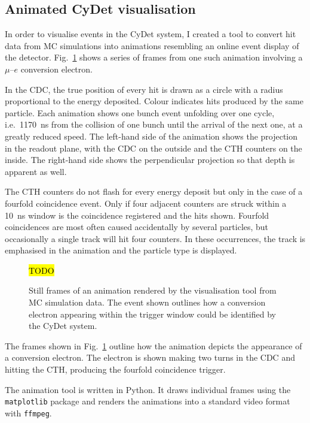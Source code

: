 \subsection{Animated CyDet visualisation}
In order to visualise events in the CyDet system, I created a tool to convert hit data from MC simulations into animations resembling an online event display of the detector. Fig.~\ref{fig:animation} shows a series of frames from one such animation involving a $\mu$--$e$ conversion electron.

In the CDC, the true position of every hit is drawn as a circle with a radius proportional to the energy deposited. Colour indicates hits produced by the same particle. Each animation shows one bunch event unfolding over one cycle, i.e.\ \SI{1170}{\ns} from the collision of one bunch until the arrival of the next one, at a greatly reduced speed.
The left-hand side of the animation shows the projection in the readout plane, with the CDC on the outside and the CTH counters on the inside. The right-hand side shows the perpendicular projection so that depth is apparent as well.

The CTH counters do not flash for every energy deposit but only in the case of a fourfold coincidence event. Only if four adjacent counters are struck within a \SI{10}{\ns} window is the coincidence registered and the hits shown. Fourfold coincidences are most often caused accidentally by several particles, but occasionally a single track will hit four counters. In these occurrences, the track is emphasised in the animation and the particle type is displayed.

\begin{figure}
    \centering
    \hl{TODO}
    \caption{Still frames of an animation rendered by the visualisation tool from MC simulation data. The event shown outlines how a conversion electron appearing within the trigger window could be identified by the CyDet system.}
    \label{fig:animation}
\end{figure}

The frames shown in Fig.~\ref{fig:animation} outline how the animation depicts the appearance of a conversion electron. The electron is shown making two turns in the CDC and hitting the CTH, producing the fourfold coincidence trigger.

The animation tool is written in Python. It draws individual frames using the \texttt{matplotlib} package and renders the animations into a standard video format with \texttt{ffmpeg}. 

